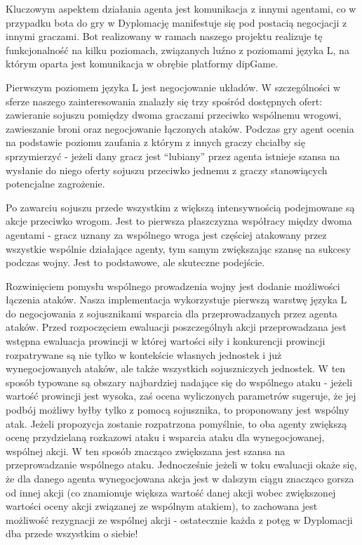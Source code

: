 Kluczowym aspektem działania agenta jest komunikacja z innymi agentami, co w przypadku bota do gry w Dyplomację manifestuje się pod postacią negocjacji z innymi graczami. Bot realizowany w ramach naszego projektu realizuje tę funkcjonalność na kilku poziomach, związanych luźno z poziomami języka L, na którym oparta jest komunikacja w obrębie platformy dipGame.

    Pierwszym poziomem języka L jest negocjowanie układów. W szczególności w sferze naszego zainteresowania znalazły się trzy spośród dostępnych ofert: zawieranie sojuszu pomiędzy dwoma graczami przeciwko wspólnemu wrogowi, zawieszanie broni oraz negocjowanie łączonych ataków. Podczas gry agent ocenia na podstawie poziomu zaufania z którym z innych graczy chciałby się sprzymierzyć - jeżeli dany gracz jest “lubiany” przez agenta istnieje szansa na wysłanie do niego oferty sojuszu przeciwko jednemu z graczy stanowiących potencjalne zagrożenie.

	    Po zawarciu sojuszu przede wszystkim z większą intensywnością podejmowane są akcje przeciwko wrogom. Jest to pierwsza płaszczyzna współracy między dwoma agentami - gracz uznany za wspólnego wroga jest częściej atakowany przez wszystkie wspólnie działające agenty, tym samym zwiększając szansę na sukcesy podczas wojny. Jest to podstawowe, ale skuteczne podejście.

		    Rozwinięciem pomysłu wspólnego prowadzenia wojny jest dodanie możliwości łączenia ataków. Nasza implementacja wykorzystuje pierwszą warstwę języka L do negocjowania z sojusznikami wsparcia dla przeprowadzanych przez agenta ataków. Przed rozpoczęciem ewaluacji poszczególnyh akcji przeprowadzana jest wstępna ewaluacja prowincji w której wartości siły i konkurencji prowincji rozpatrywane są nie tylko w kontekście własnych jednostek i już wynegocjowanych ataków, ale także wszystkich sojuszniczych jednostek. W ten sposób typowane są obszary najbardziej nadające się do wspólnego ataku - jeżeli wartość prowincji jest wysoka, zaś ocena wyliczonych parametrów sugeruje, że jej podbój możliwy byłby tylko z pomocą sojusznika, to proponowany jest wspólny atak. Jeżeli propozycja zostanie rozpatrzona pomyślnie, to oba agenty zwiększą ocenę przydzielaną rozkazowi ataku i wsparcia ataku dla wynegocjowanej, wspólnej akcji. W ten sposób znacząco zwiększana jest szansa na przeprowadzanie wspólnego ataku. Jednocześnie jeżeli w toku ewaluacji okaże się, że dla danego agenta wynegocjowana akcja jest w dalszym ciągu znacząco gorsza od innej akcji (co znamionuje większa wartość danej akcji wobec zwiększonej wartości oceny akcji związanej ze wspólnym atakiem), to zachowana jest możliwość rezygnacji ze wspólnej akcji - ostatecznie każda z potęg w Dyplomacji dba przede wszystkim o siebie!

